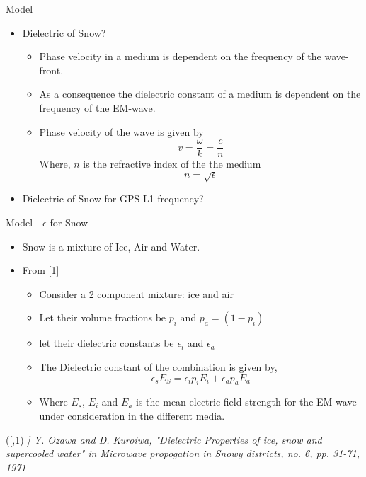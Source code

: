 \documentclass{beamer}
\newenvironment{reference}[2]{%
  \begin{textblock*}{\textwidth}(#1,#2) 
      \footnotesize\it\bgroup\color{red!50!black}}{\egroup\end{textblock*}}
\begin{document}
\begin{frame}{Model}
\begin{itemize}
  \item Dielectric of Snow?
    \begin{itemize}
      \item Phase velocity in a medium is dependent on the frequency of the wave-front.
      \item As a consequence the dielectric constant of a medium is dependent on the frequency of the EM-wave.
      \item Phase velocity of the wave is given by
        \begin{equation*}
          v = \frac{\omega}{k} = \frac{c}{n}
        \end{equation*}
        Where, $n$ is the refractive index of the the medium
        \begin{equation*}
          n = \sqrt{\epsilon}
        \end{equation*}
    \end{itemize}
    \item Dielectric of Snow for GPS L1 frequency?
\end{itemize}
\end{frame}

\begin{frame}{Model - $\epsilon$ for Snow}
\begin{itemize}
  \item Snow is a mixture of Ice, Air and Water.
  \item From [1]
    \begin{itemize}
      \item Consider a 2 component mixture: ice and air
      \item Let their volume fractions be $p_i$ and $p_a=(1-p_i)$
      \item let their dielectric constants be $\epsilon_i$ and $\epsilon_a$
      \item The Dielectric constant of the combination is given by,
        \begin{equation}
          \epsilon_s E_S = \epsilon_i p_i E_i + \epsilon_a p_a E_a
        \end{equation}
      \item Where $E_s$, $E_i$ and $E_a$ is the mean electric field strength for the EM wave under consideration in the different media.
    \end{itemize}
\end{itemize}

\begin{reference}{4mm}{85mm}
  [1] Y. Ozawa and D. Kuroiwa, "Dielectric Properties of ice, snow and supercooled water" in Microwave propogation in Snowy districts, no. 6, pp. 31-71, 1971
\end{reference}

\end{frame}
\end{document}
